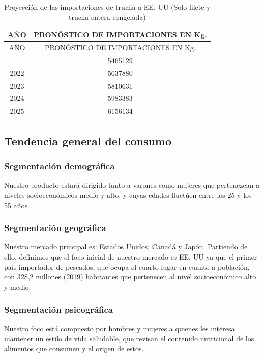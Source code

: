 \documentclass[
  stu,
  floatsintext,
  longtable,
  a4paper,
  nolmodern,
  notxfonts,
  notimes,
  12pt,
  colorlinks=true,linkcolor=blue,citecolor=blue,urlcolor=blue]{apa7}
\begin{document}
\begin{longtable}[]{@{}cc@{}}
\caption{Proyección de las importaciones de trucha a EE. UU (Solo filete
y trucha entera congelada)}\tabularnewline
\toprule\noalign{}
AÑO & PRONÓSTICO DE IMPORTACIONES EN Kg. \\
\midrule\noalign{}
\endfirsthead
\toprule\noalign{}
AÑO & PRONÓSTICO DE IMPORTACIONES EN Kg. \\
\midrule\noalign{}
\endhead
\bottomrule\noalign{}
\endlastfoot
2021 & 5465129 \\
2022 & 5637880 \\
2023 & 5810631 \\
2024 & 5983383 \\
2025 & 6156134 \\
\end{longtable}

\subsection{Tendencia general del
consumo}\label{tendencia-general-del-consumo}

\subsubsection{Segmentación
demográfica}\label{segmentaciuxf3n-demogruxe1fica}

Nuestro producto estará dirigido tanto a varones como mujeres que
pertenezcan a niveles socioeconómicos medio y alto, y cuyas edades
fluctúen entre los 25 y los 55 años.

\subsubsection{Segmentación
geográfica}\label{segmentaciuxf3n-geogruxe1fica}

Nuestro mercado principal es: Estados Unidos, Canadá y Japón. Partiendo
de ello, definimos que el foco inicial de nuestro mercado es EE. UU ya
que el primer país importador de pescados, que ocupa el cuarto lugar en
cuanto a población, con 328,2 millones (2019) habitantes que pertenecen
al nivel socioeconómico alto y medio.

\subsubsection{Segmentación
psicográfica}\label{segmentaciuxf3n-psicogruxe1fica}

Nuestro foco está compuesto por hombres y mujeres a quienes les interesa
mantener un estilo de vida saludable, que revisan el contenido
nutricional de los alimentos que consumen y el origen de estos.
\end{document}
